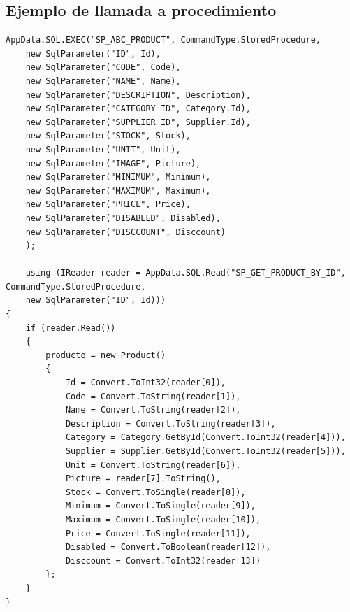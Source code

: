 \documentclass[a4paper,DIV=12]{scrreprt}
\begin{document}
\subsection{Ejemplo de llamada a procedimiento}

\begin{lstlisting}[language={[Sharp]C}]
    AppData.SQL.EXEC("SP_ABC_PRODUCT", CommandType.StoredProcedure,
    new SqlParameter("ID", Id),
    new SqlParameter("CODE", Code),
    new SqlParameter("NAME", Name),
    new SqlParameter("DESCRIPTION", Description),
    new SqlParameter("CATEGORY_ID", Category.Id),
    new SqlParameter("SUPPLIER_ID", Supplier.Id),
    new SqlParameter("STOCK", Stock),
    new SqlParameter("UNIT", Unit),
    new SqlParameter("IMAGE", Picture),
    new SqlParameter("MINIMUM", Minimum),
    new SqlParameter("MAXIMUM", Maximum),
    new SqlParameter("PRICE", Price),
    new SqlParameter("DISABLED", Disabled),
    new SqlParameter("DISCCOUNT", Disccount)
    );

    using (IReader reader = AppData.SQL.Read("SP_GET_PRODUCT_BY_ID", CommandType.StoredProcedure, 
    new SqlParameter("ID", Id)))
{
    if (reader.Read())
    {
        producto = new Product()
        {
            Id = Convert.ToInt32(reader[0]),
            Code = Convert.ToString(reader[1]),
            Name = Convert.ToString(reader[2]),
            Description = Convert.ToString(reader[3]),
            Category = Category.GetById(Convert.ToInt32(reader[4])),
            Supplier = Supplier.GetById(Convert.ToInt32(reader[5])),
            Unit = Convert.ToString(reader[6]),
            Picture = reader[7].ToString(),
            Stock = Convert.ToSingle(reader[8]),
            Minimum = Convert.ToSingle(reader[9]),
            Maximum = Convert.ToSingle(reader[10]),
            Price = Convert.ToSingle(reader[11]),
            Disabled = Convert.ToBoolean(reader[12]),
            Disccount = Convert.ToInt32(reader[13])
        };
    }
}
\end{lstlisting}
    
















\end{document}
